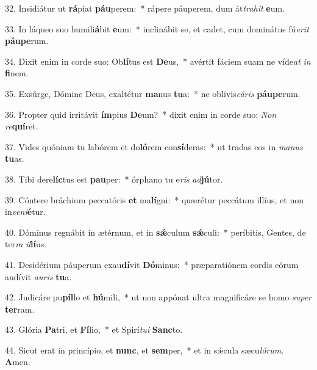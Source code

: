 32. Insidiátur ut \textbf{rá}piat \textbf{páu}perem:~*  rápere páuperem, dum át\textit{tra}\textit{hit} \textbf{e}um.\

33. In láqueo suo humili\textbf{á}bit \textbf{e}um:~*  inclinábit se, et cadet, cum dominátus fú\textit{e}\textit{rit} \textbf{páu}\textbf{pe}rum.\

34. Dixit enim in corde suo: Ob\textbf{lí}tus est \textbf{De}us,~*  avértit fáciem suam ne víde\textit{at} \textit{in} \textbf{fi}nem.\

35. Exsúrge, Dómine Deus, exaltétur \textbf{ma}nus \textbf{tu}a:~*  ne oblivis\textit{cá}\textit{ris} \textbf{páu}\textbf{pe}rum.\

36. Propter quid irritávit \textbf{ím}pius \textbf{De}um?~*  dixit enim in corde suo: \textit{Non} \textit{re}\textbf{quí}ret.\

37. Vides quóniam tu labórem et do\textbf{ló}rem con\textbf{sí}deras:~*  ut tradas eos in \textit{ma}\textit{nus} \textbf{tu}as.\

38. Tibi dere\textbf{líc}tus est \textbf{pau}per:~*  órphano tu e\textit{ris} \textit{ad}\textbf{jú}tor.\

39. Cóntere bráchium peccatóris \textbf{et} ma\textbf{lí}gni:~*  quærétur peccátum illíus, et non in\textit{ve}\textit{ni}\textbf{é}tur.\

40. Dóminus regnábit in ætérnum, et in \textbf{sǽ}culum \textbf{sǽ}culi:~*  períbitis, Gentes, de ter\textit{ra} \textit{il}\textbf{lí}us.\

41. Desidérium páuperum exau\textbf{dí}vit \textbf{Dó}minus:~*  præparatiónem cordis eórum audívit \textit{au}\textit{ris} \textbf{tu}a.\

42. Judicáre pu\textbf{píl}lo et \textbf{hú}mili,~*  ut non appónat ultra magnificáre se homo \textit{su}\textit{per} \textbf{ter}ram.\

43. Glória \textbf{Pa}tri, et \textbf{Fí}lio,~*  et Spirí\textit{tu}\textit{i} \textbf{Sanc}to.\

44. Sicut erat in princípio, et \textbf{nunc}, et \textbf{sem}per,~*  et in sǽcula sæcu\textit{ló}\textit{rum}. \textbf{A}men.\

